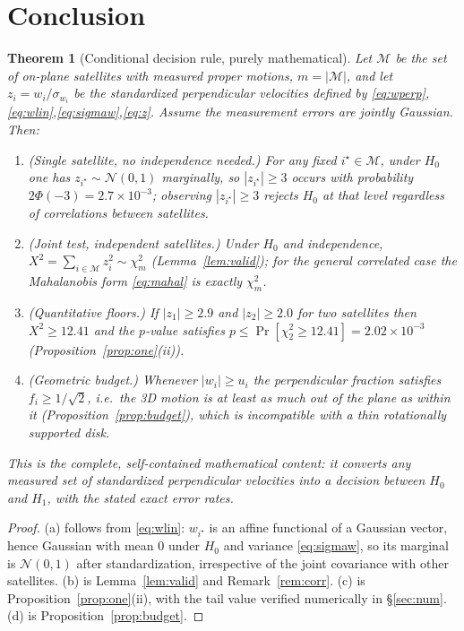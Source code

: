 \documentclass{amsart}
\newtheorem{theorem}{Theorem}
\theoremstyle{definition}
\begin{document}
\section{Conclusion}

\begin{theorem}[Conditional decision rule, purely mathematical]\label{thm:cond}
Let $\mathcal M$ be the set of on-plane satellites with measured proper
motions, $m=|\mathcal M|$, and let $z_i=w_i/\sigma_{w_i}$ be the standardized
perpendicular velocities defined by
\eqref{eq:wperp},\eqref{eq:wlin},\eqref{eq:sigmaw},\eqref{eq:z}. Assume the
measurement errors are jointly Gaussian. Then:
\begin{enumerate}
\item[(a)] (Single satellite, no independence needed.) For any fixed
  $i^\star\in\mathcal M$, under $H_0$ one has $z_{i^\star}\sim\mathcal N(0,1)$
  marginally, so $|z_{i^\star}|\ge 3$ occurs with probability
  $2\Phi(-3)=2.7\times10^{-3}$; observing $|z_{i^\star}|\ge3$ rejects $H_0$
  at that level regardless of correlations between satellites.
\item[(b)] (Joint test, independent satellites.) Under $H_0$ and
  independence, $X^2=\sum_{i\in\mathcal M}z_i^2\sim\chi^2_m$
  (Lemma~\ref{lem:valid}); for the general correlated case the Mahalanobis
  form \eqref{eq:mahal} is exactly $\chi^2_m$.
\item[(c)] (Quantitative floors.) If $|z_1|\ge 2.9$ and $|z_2|\ge 2.0$ for
  two satellites then $X^2\ge 12.41$ and the $p$-value satisfies
  $p\le\Pr[\chi^2_2\ge12.41]=2.02\times10^{-3}$
  (Proposition~\ref{prop:one}(ii)).
\item[(d)] (Geometric budget.) Whenever $|w_i|\ge u_i$ the perpendicular
  fraction satisfies $f_i\ge 1/\sqrt2$, i.e.\ the 3D motion is at least as
  much out of the plane as within it (Proposition~\ref{prop:budget}), which
  is incompatible with a thin rotationally supported disk.
\end{enumerate}
This is the complete, self-contained mathematical content: it converts any
measured set of standardized perpendicular velocities into a decision between
$H_0$ and $H_1$, with the stated exact error rates.
\end{theorem}
\begin{proof}
(a) follows from \eqref{eq:wlin}: $w_{i^\star}$ is an affine functional of a
Gaussian vector, hence Gaussian with mean $0$ under $H_0$ and variance
\eqref{eq:sigmaw}, so its marginal is $\mathcal N(0,1)$ after
standardization, irrespective of the joint covariance with other satellites.
(b) is Lemma~\ref{lem:valid} and Remark~\ref{rem:corr}. (c) is
Proposition~\ref{prop:one}(ii), with the tail value verified numerically in
\S\ref{sec:num}. (d) is Proposition~\ref{prop:budget}.
\end{proof}
\end{document}
